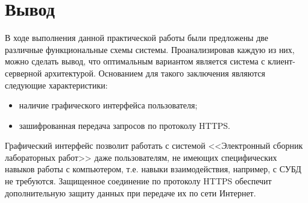 \documentclass[a4paper,14pt]{extarticle}
\begin{document}
\section*{Вывод}

В ходе выполнения данной практической работы были предложены две различные функциональные схемы системы.
Проанализировав каждую из них, можно сделать вывод, что оптимальным вариантом является система с клиент-серверной архитектурой. Основанием для такого заключения являются следующие характеристики:
\begin{itemize}
	\item  наличие графического интерфейса пользователя;
\item зашифрованная передача запросов по протоколу HTTPS.
\end{itemize}
Графический интерфейс позволит работать с системой <<Электронный сборник лабораторных работ>> даже пользователям, не имеющих специфических навыков работы с компьютером, т.е. навыки взаимодействия, например, с СУБД не требуются. Защищенное соединение по протоколу HTTPS обеспечит дополнительную защиту данных при передаче их по сети Интернет.
\end{document}
